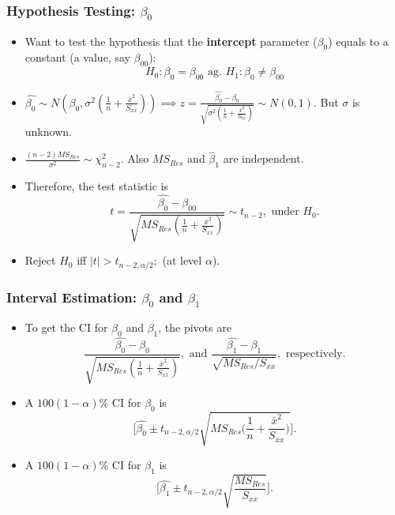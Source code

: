 \documentclass[10pt]{beamer} %
\begin{document}
\begin{frame}
	\frametitle{Hypothesis Testing: $\beta_0$ }
\begin{itemize}
	
	\item Want to test the hypothesis that the \textbf{intercept} parameter ($\beta_0$) equals to a constant (a value, say $\beta_{00}$):
	$$H_0: \beta_0 = \beta_{00} \mbox{ ag. } H_1: \beta_0 \neq \beta_{00} $$
%	
	
	\item $\hat{\beta_0} \sim N(\beta_0, \sigma^2(\frac{1}{n} + \frac{\bar{x}^2}{S_{xx}})) \implies z = \frac{\hat{\beta_0} - \beta_0}{\sqrt{\sigma^2(\frac{1}{n} + \frac{\bar{x}^2}{S_{xx}})}} \sim N(0, 1)$. But $\sigma$ is unknown. 
	\vspace{0.2cm}
	
	\item $\frac{(n-2) MS_{Res}}{\sigma^2} \sim \chi_{n-2}^2$. Also $MS_{Res}$ and $\hat\beta_1$ are independent. 
	\vspace{0.2cm}
	
	\item Therefore, the test statistic is 
	$$t = \frac{\hat{\beta_0} - \beta_{00}}{\sqrt{MS_{Res}(\frac{1}{n} + \frac{\bar{x}^2}{S_{xx}})}} \sim t_{n-2}, \mbox{ under } H_0.  $$
	
	\item Reject $H_0$ iff $|t| > t_{n-2, \alpha/2};$ (at level $\alpha$). 
\end{itemize}
	
\end{frame}


\begin{frame}
	\frametitle{Interval Estimation: $\beta_0$ and $\beta_1$ }
\begin{itemize}
\item To get the CI for $\beta_0$ and $\beta_1$, the pivots are
$$\frac{\hat{\beta_0} - \beta_{0}}{\sqrt{MS_{Res}(\frac{1}{n} + \frac{\bar{x}^2}{S_{xx}})}}, \mbox{ and } \frac{\hat{\beta_1} - \beta_{1}}{\sqrt{MS_{Res}/S_{xx}}}, \mbox{ respectively.} $$
	\vspace{0.2cm}

\item A $100(1-\alpha)\%$ CI for $\beta_0$ is 
$$\Bigg[\hat{\beta_0} \pm t_{n-2, \alpha/2} \sqrt{MS_{Res}\Big(\frac{1}{n} + \frac{\bar{x}^2}{S_{xx}}\Big)} \Bigg]. $$

	\vspace{0.2cm}

\item A $100(1-\alpha)\%$ CI for $\beta_1$ is 
$$\Bigg[\hat{\beta_1} \pm t_{n-2, \alpha/2} \sqrt{\frac{MS_{Res}}{S_{xx}}} \Bigg]. $$


\end{itemize}	

\end{frame}
\end{document}
